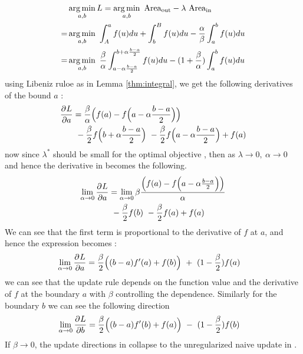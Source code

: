 \begin{equation}
\begin{aligned} 
&\operatorname*{arg\,min}_{a,b} L = \operatorname*{arg\,min}_{a,b}~ \text{Area}_{\text{out}} - \lambda ~ \text{Area}_{\text{in}} \\
=& \operatorname*{arg\,min}_{a,b}~ \int_{A}^{a}f(u)du + \int_{b}^{B}f(u)du - \frac{\alpha}{\beta} \int_{a}^{b}f(u)du \\
=& \operatorname*{arg\,min}_{a,b}~ \frac{\beta}{\alpha} \int_{a - \alpha \frac{b-a}{2}}^{b + \alpha \frac{b-a}{2} }f(u)du  - (1+\frac{\beta}{\alpha})\int_{a}^{b}f(u)du \\ 
\label{eq:loss-oir2-sup}
\end{aligned}
\end{equation}
using Libeniz ruloe as in Lemma \ref{thm:integral}, we get the following derivatives of the bound $a$ :
\begin{equation}
\begin{aligned} 
\frac{\partial^{} L}{\partial a} &= \frac{\beta}{\alpha}\Big(f(a) - f\Big(a - \alpha \frac{b-a}{2}\Big) \Big) \\&~- \frac{\beta}{2}f\Big(b + \alpha \frac{b-a}{2}\Big) ~ - \frac{\beta}{2}f\Big(a - \alpha \frac{b-a}{2}\Big) + f(a) 
\label{eq:update-oir-1}
\end{aligned}
\end{equation}
now since $\lambda^{*}$ should be small for the optimal objective , then as $\lambda \rightarrow 0 ,~ \alpha \rightarrow 0$ and hence the derivative in \eqLabel{\ref{eq:update-oir-1}} becomes the following.  
\begin{equation}
\begin{aligned} 
\lim_{\alpha \to 0}\frac{\partial^{} L}{\partial a} &= \lim_{\alpha \to 0} \beta\frac{\Big(f(a) - f\Big(a - \alpha \frac{b-a}{2}\Big) \Big)}{\alpha} \\&~- \frac{\beta}{2}f(b) ~- \frac{\beta}{2}f(a) + f(a) 
\label{eq:update-oir-2}
\end{aligned}
\end{equation}
We can see that the first term is proportional to the derivative of $f$ at $a$, and hence the expression becomes :
\begin{equation}
\begin{aligned} 
\lim_{\alpha \to 0}\frac{\partial^{} L}{\partial a} &= \frac{\beta}{2}\Big((b-a)f^{\prime}(a) + f(b)\Big) ~+~ (1-\frac{\beta}{2})f(a) 
\label{eq:update-oir-3-sup}
\end{aligned}
\end{equation}
we can see that the update rule depends on the function value and the derivative of $f$ at the boundary $a$ with $\beta$ controlling the dependence. Similarly for the boundary $b$ we can see the following direction
\begin{equation}
\begin{aligned} 
\lim_{\alpha \to 0}\frac{\partial^{} L}{\partial b} &= \frac{\beta}{2}\Big((b-a)f^{\prime}(b) + f(a)\Big) ~-~ (1-\frac{\beta}{2})f(b) 
\label{eq:update-oir-4}
\end{aligned}
\end{equation}
If $\beta \rightarrow 0 $, the update directions in \eqLabel{\ref{eq:update-oir-3-sup},\ref{eq:update-oir-4}} collapse to the unregularized naive update in \eqLabel{\ref{eq:update-naive-1-sup}} .\\

